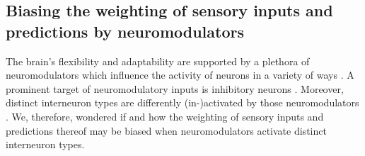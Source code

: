 \documentclass[10pt,a4paper]{article}
\begin{document}
\subsection*{Biasing the weighting of sensory inputs and predictions by neuromodulators}
%
The brain's flexibility and adaptability are supported by a plethora of neuromodulators which influence the activity of neurons in a variety of ways \citep{avery2017neuromodulatory}. A prominent target of neuromodulatory inputs is inhibitory neurons \citep{cardin2019functional,  hattori2017functions, swanson2019hiring}. Moreover, distinct interneuron types are differently (in-)activated by those neuromodulators \citep{wester2014behavioral, hattori2017functions, swanson2019hiring}. We, therefore, wondered if and how the weighting of sensory inputs and predictions thereof may be biased when neuromodulators activate distinct interneuron types.
%
\end{document}

